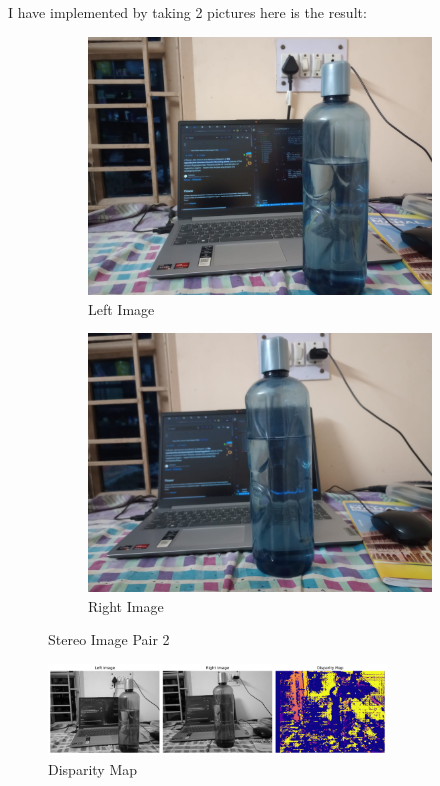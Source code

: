 \documentclass[12pt]{article}
\begin{document}
I have implemented by taking 2 pictures here is the result:
\begin{figure}[H]
    \centering
    \begin{subfigure}[b]{0.45\textwidth}
        \includegraphics[width=\textwidth]{left2.jpg}
        \caption{Left Image}
    \end{subfigure}
    \hfill
    \begin{subfigure}[b]{0.45\textwidth}
        \includegraphics[width=\textwidth]{right2.jpg}
        \caption{Right Image}
    \end{subfigure}
    \caption{Stereo Image Pair 2}
\end{figure}
\begin{figure}[H]
    \centering
    \includegraphics[width=0.8\textwidth]{disparity_result.png}
    \caption{Disparity Map}
\end{figure}
\end{document}
